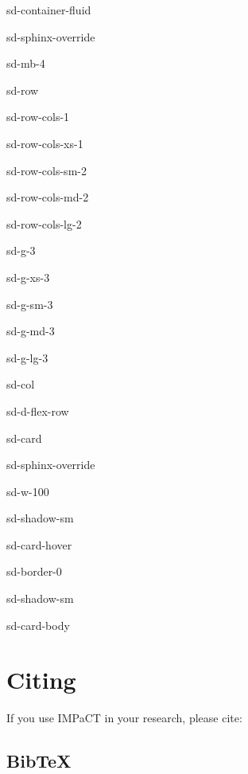 \documentclass[a4paper,10pt,english]{sphinxmanual}
\begin{document}
\begin{sphinxuseclass}{sd-container-fluid}
\begin{sphinxuseclass}{sd-sphinx-override}
\begin{sphinxuseclass}{sd-mb-4}
\begin{sphinxuseclass}{sd-row}
\begin{sphinxuseclass}{sd-row-cols-1}
\begin{sphinxuseclass}{sd-row-cols-xs-1}
\begin{sphinxuseclass}{sd-row-cols-sm-2}
\begin{sphinxuseclass}{sd-row-cols-md-2}
\begin{sphinxuseclass}{sd-row-cols-lg-2}
\begin{sphinxuseclass}{sd-g-3}
\begin{sphinxuseclass}{sd-g-xs-3}
\begin{sphinxuseclass}{sd-g-sm-3}
\begin{sphinxuseclass}{sd-g-md-3}
\begin{sphinxuseclass}{sd-g-lg-3}
\begin{sphinxuseclass}{sd-col}
\begin{sphinxuseclass}{sd-d-flex-row}
\begin{sphinxuseclass}{sd-card}
\begin{sphinxuseclass}{sd-sphinx-override}
\begin{sphinxuseclass}{sd-w-100}
\begin{sphinxuseclass}{sd-shadow-sm}
\begin{sphinxuseclass}{sd-card-hover}
\begin{sphinxuseclass}{sd-border-0}
\begin{sphinxuseclass}{sd-shadow-sm}
\begin{sphinxuseclass}{sd-card-body}
\end{sphinxuseclass}{\hyperref[\detokenize{examples/advanced::doc}]{}}
\end{sphinxuseclass}
\end{sphinxuseclass}
\end{sphinxuseclass}
\end{sphinxuseclass}
\end{sphinxuseclass}
\end{sphinxuseclass}
\end{sphinxuseclass}
\end{sphinxuseclass}
\end{sphinxuseclass}
\end{sphinxuseclass}
\end{sphinxuseclass}
\end{sphinxuseclass}
\end{sphinxuseclass}
\end{sphinxuseclass}
\end{sphinxuseclass}
\end{sphinxuseclass}
\end{sphinxuseclass}
\end{sphinxuseclass}
\end{sphinxuseclass}
\end{sphinxuseclass}
\end{sphinxuseclass}
\end{sphinxuseclass}
\end{sphinxuseclass}
\sphinxstepscope


\section{Citing}
\label{\detokenize{citing:citing}}\label{\detokenize{citing::doc}}
\sphinxAtStartPar
If you use IMPaCT in your research, please cite:


\subsection{BibTeX}
\label{\detokenize{citing:bibtex}}
\sphinxAtStartPar
{}
\end{document}
